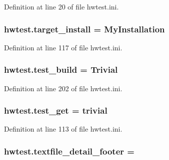 Definition at line 20 of file hwtest.\-ini.

\hypertarget{namespacehwtest_ae44fdc8b804d0261bc648dc81fccf671}{
\subsubsection[{target\-\_\-install}]{\setlength{\rightskip}{0pt plus 5cm}hwtest.\-target\-\_\-install = My\-Installation}}\label{namespacehwtest_ae44fdc8b804d0261bc648dc81fccf671}


Definition at line 117 of file hwtest.\-ini.

\hypertarget{namespacehwtest_a5ba5b6a44052b71d5033b0673947ced0}{
\subsubsection[{test\-\_\-build}]{\setlength{\rightskip}{0pt plus 5cm}hwtest.\-test\-\_\-build = Trivial}}\label{namespacehwtest_a5ba5b6a44052b71d5033b0673947ced0}


Definition at line 202 of file hwtest.\-ini.

\hypertarget{namespacehwtest_a10d7a3bc8e20a9b333fb253328ca7e8c}{
\subsubsection[{test\-\_\-get}]{\setlength{\rightskip}{0pt plus 5cm}hwtest.\-test\-\_\-get = trivial}}\label{namespacehwtest_a10d7a3bc8e20a9b333fb253328ca7e8c}


Definition at line 113 of file hwtest.\-ini.

\hypertarget{namespacehwtest_acf23440e8c05d17e5b3bb0c6a6a7a12a}{
\subsubsection[{textfile\-\_\-detail\-\_\-footer}]{\setlength{\rightskip}{0pt plus 5cm}hwtest.\-textfile\-\_\-detail\-\_\-footer =}}\label{namespacehwtest_acf23440e8c05d17e5b3bb0c6a6a7a12a}


